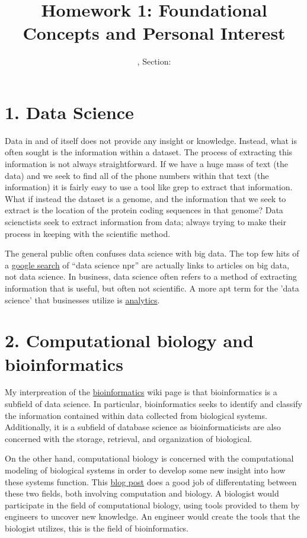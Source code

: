 \documentclass[11pt]{article}
\title{Homework 1: Foundational Concepts and Personal Interest}
\author{\Name, Section: \Sec}%
\begin{document}
\maketitle

\section*{1. Data Science}

Data in and of itself does not provide any insight or knowledge. Instead, 
what is often sought is the information within a dataset. The process of extracting
this information is not always straightforward. If we have a huge mass of text (the data)
and we seek to find all of the phone numbers within that text (the information) it
is fairly easy to use a tool like grep to extract that information. What if instead the
dataset is a genome, and the information that we seek to extract is the location of 
the protein coding sequences in that genome? Data scienctists seek to extract information
from data; always trying to make their process in keeping with the scientific method.

The general public often confuses data science with big data. The top few hits of a
\href{https://www.google.com/search?q=data+science+npr&oq=data+science+npr&aqs=chrome..69i57j0.3516j0j7&sourceid=chrome&espv=210&es_sm=91&ie=UTF-8}{google search} 
of ``data science npr'' are actually links to articles on big data, not data science. In business,
data science often refers to a method of extracting information that is useful, but
often not scientific. A more apt term for the 'data science' that businesses utilize
is \href{http://en.wikipedia.org/wiki/Analytics}{analytics}.


\section*{2.  Computational biology and bioinformatics}

My interpreation of the 
\href{http://en.wikipedia.org/wiki/Bioinformatics}{bioinformatics} 
wiki page is that bioinformatics is a subfield of data science. 
In particular, bioinformatics seeks to identify and classify the information
contained within data collected from biological systems. 
Additionally, it is a subfield of database science as bioinformaticists are also
concerned with the storage, retrieval, and organization of biological. 

On the other hand, computational biology is concerned with the computational 
modeling of biological systems in order to develop some new insight into 
how these systems function. 
This \href{http://rbaltman.wordpress.com/2009/02/18/bioinformatics-computational-biology-same-no/}{blog post}
does a good job of differentating between these two fields, both involving computation 
and biology. A biologist would participate in the field of computational biology, using
tools provided to them by engineers to uncover new knowledge. An engineer would 
create the tools that the biologist utilizes, this is the field of bioinformatics.
\end{document}
